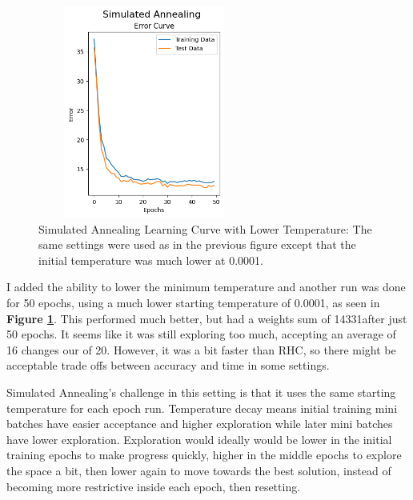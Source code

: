 \documentclass[letterpaper]{article} %
\begin{document}
\begin{figure}[!htb]
\centering
\includegraphics[width=2.75in, height=2.75in]{figures/Simulated_Annealing__epochs_50_temperature_0_0001_min_temp_1e_06_decay_geom_max_iters_20_max_attempts_5_seed_1_Error_Curve.png}
\caption{Simulated Annealing Learning Curve with Lower Temperature:  The same settings were used as in the previous figure except that the initial temperature was much lower at 0.0001.  }
\label{fig:nn_sa_adjusted}
\end{figure}

I added the ability to lower the minimum temperature and another run was done for 50 epochs, using a much lower starting temperature of 0.0001, as seen in  \textbf{Figure \ref{fig:nn_sa_adjusted}}.  This performed much better, but had a weights sum of 14331after just 50 epochs.  It seems like it was still exploring too much, accepting an average of 16 changes our of 20. However, it was a bit faster than RHC, so there might be acceptable trade offs between accuracy and time in some settings.

Simulated Annealing's challenge in this setting is that it uses the same starting temperature for each epoch run.  Temperature decay means initial training mini batches have easier acceptance and higher exploration while later mini batches have lower exploration.  Exploration would ideally would be lower in the initial training epochs to make progress quickly,  higher in the middle epochs to explore the space a bit, then lower again to move towards the best solution, instead of becoming more restrictive inside each epoch, then resetting.
\end{document}
